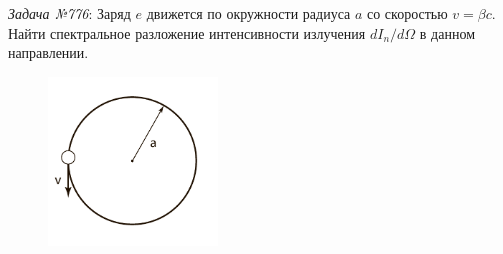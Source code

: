 \newpage


\emph{Задача №776}: Заряд \( e \) движется по окружности радиуса \( a \)
со скоростью \( v = \beta c \). Найти спектральное разложение интенсивности излучения
\( dI_n / d\Omega \) в данном направлении.

\begin{figure}[ht]
    \center
	\includegraphics[width=0.4\textwidth]{pdf/03.pdf}
\end{figure}

